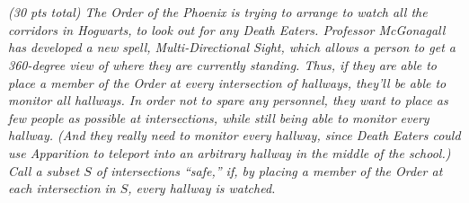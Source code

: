\documentclass[12pt]{article} \setlength{\oddsidemargin}{0in}
\begin{document}
\section{}
\textit{(30 pts total) The Order of the Phoenix is trying to arrange to watch all the corridors in Hogwarts, to look out for any Death Eaters. Professor McGonagall has developed a new spell, Multi-Directional Sight, which allows a person to get a 360-degree view of where they are currently standing. Thus, if they are able to place a member of the Order at every intersection of hallways, they'll be able to monitor all hallways. In order not to spare any personnel, they want to place as few people as possible at intersections, while still being able to monitor every hallway. (And they really need to monitor every hallway, since Death Eaters could use Apparition to teleport into an arbitrary hallway in the middle of the school.) Call a subset $S$ of intersections ``safe,'' if, by placing a member of the Order at each intersection in $S$, every hallway is watched.}
\end{document}
